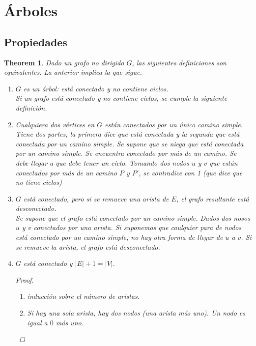 \documentclass[12pt, fleqn]{article}
\newtheorem{theorem}{Theorem}[section]
\begin{document}
    \section{Árboles}
        \subsection{Propiedades}
            \begin{theorem}
                Dado un grafo no dirigido $G$, las siguientes definiciones son equivalentes. La anterior implica la que sigue.
                \begin{enumerate}
                    \item $G$ es un árbol: está conectado y no contiene ciclos.\\ 
                            \emph{Si un grafo está conectado y no contiene ciclos, se cumple la siguiente definición.}
                    \item Cualquiera dos vértices en $G$ están conectados por un único camino simple. \\ 
                            \emph{Tiene dos partes, la primera dice 
                            que está conectada y la segunda que está conectada por un camino simple. Se supone que se niega que está conectada por un camino simple.
                            Se encuentra conectado por más de un camino. Se debe llegar a que debe tener un ciclo. Tomando dos nodos $u$ y $v$ que están conectados
                            por más de un camino $P$ y $P'$, se contradice con 1 (que dice que no tiene ciclos)}
                    \item $G$ está conectado, pero si se remueve una arista de $E$, el grafo resultante está desconectado. 
                    \\ \emph{Se supone que el grafo está conectado
                        por un camino simple. Dados dos nosos $u$ y $v$ conectados por una arista. Si suponemos que caulquier para de nodos está conectado por un camino
                        simple, no hay otra forma de llegar de $u$ a $v$. Si se remueve la arista, el grafo está desconectado.}
                    \item $G$ está conectado y $|E| + 1 = |V| $. 
                        \begin{proof}
                            \begin{enumerate}
                                \item inducción sobre el número de aristas.
                                \item Si hay una sola arista, hay dos nodos (una arista más uno). Un nodo es igual a $0$ más uno.

\end{enumerate}
\end{proof}
\end{enumerate}
\end{theorem}
\end{document}
